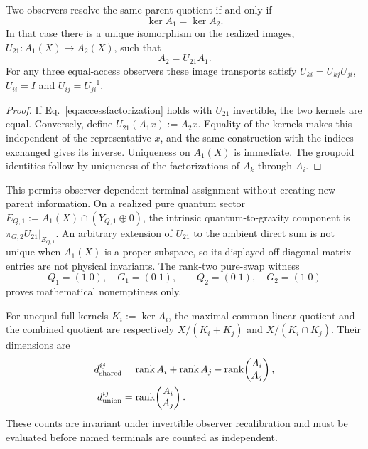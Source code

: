 \begin{proposition}
\label{prop:jointaccessmixing}
Two observers resolve the same parent quotient if and only if
\begin{equation}
 \ker A_1=\ker A_2.
 \label{eq:equalaccesskernels}
\end{equation}
In that case there is a unique isomorphism on the realized images,
$U_{21}:A_1(X)\to A_2(X)$, such that
\begin{equation}
 A_2=U_{21}A_1.
 \label{eq:accessfactorization}
\end{equation}
For any three equal-access observers these image transports satisfy
$U_{ki}=U_{kj}U_{ji}$, $U_{ii}=I$ and $U_{ij}=U_{ji}^{-1}$.
\end{proposition}

\begin{proof}
If Eq.~\eqref{eq:accessfactorization} holds with $U_{21}$ invertible, the two
kernels are equal. Conversely, define $U_{21}(A_1x):=A_2x$. Equality of the
kernels makes this independent of the representative $x$, and the same
construction with the indices exchanged gives its inverse. Uniqueness on
$A_1(X)$ is immediate. The groupoid identities follow by uniqueness of the
factorizations of $A_k$ through $A_i$.
\end{proof}

This permits observer-dependent terminal assignment without creating new
parent information. On a realized pure quantum sector
$E_{Q,1}:=A_1(X)\cap(Y_{Q,1}\oplus0)$, the intrinsic quantum-to-gravity
component is $\pi_{G,2}U_{21}|_{E_{Q,1}}$. An arbitrary extension of $U_{21}$
to the ambient direct sum is not unique when $A_1(X)$ is a proper subspace, so
its displayed off-diagonal matrix entries are not physical invariants. The
rank-two pure-swap witness
\begin{equation}
 Q_1=(1\;0),\quad G_1=(0\;1),\qquad
 Q_2=(0\;1),\quad G_2=(1\;0)
 \label{eq:pureswapwitness}
\end{equation}
proves mathematical nonemptiness only.

For unequal full kernels $K_i:=\ker A_i$, the maximal common linear quotient
and the combined quotient are respectively $X/(K_i+K_j)$ and
$X/(K_i\cap K_j)$. Their dimensions are
\begin{align}
 d_{\rm shared}^{ij}
 &=\operatorname{rank} A_i+\operatorname{rank} A_j
   -\operatorname{rank}\!\begin{pmatrix}A_i\\A_j\end{pmatrix},
 \label{eq:shareddimension}\\
 d_{\rm union}^{ij}
 &=\operatorname{rank}\!\begin{pmatrix}A_i\\A_j\end{pmatrix}.
 \label{eq:uniondimension}
\end{align}
These counts are invariant under invertible observer recalibration and must
be evaluated before named terminals are counted as independent.

